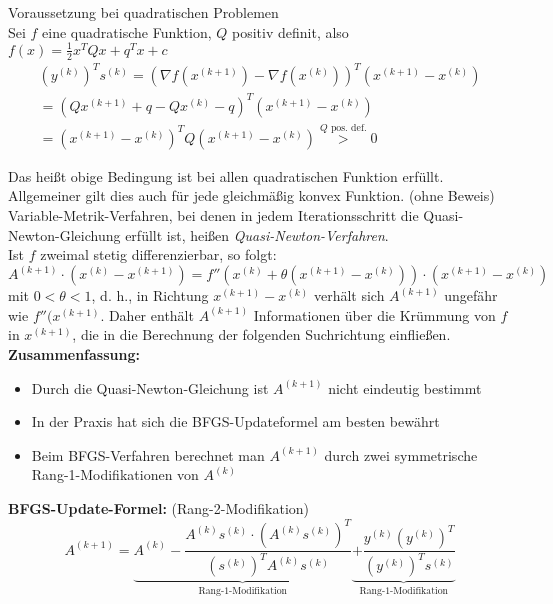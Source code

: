 \begin{Beispiel}{Voraussetzung bei quadratischen Problemen\\}
Sei $f$ eine quadratische Funktion, $Q$ positiv definit, also $f(x)=\frac{1}{2}x^TQx+q^Tx+c$
\begin{align*}
(y^{(k)})^Ts^{(k)} = (\nabla f(x^{(k+1)}) - \nabla f(x^{(k)}))^T(x^{(k+1)} - x^{(k)})\\
= (Qx^{(k+1)}+q - Qx^{(k)}-q)^T(x^{(k+1)} - x^{(k)})\\
=(x^{(k+1)} - x^{(k)})^TQ(x^{(k+1)} - x^{(k)}) \overset{Q\text{ pos. def.}}{>}0
\end{align*}
\end{Beispiel}

Das heißt obige Bedingung ist bei allen quadratischen Funktion erfüllt. Allgemeiner gilt dies auch für jede gleichmäßig konvex Funktion. (ohne Beweis)\\
Variable-Metrik-Verfahren, bei denen in jedem Iterationsschritt die
Quasi-Newton-Gleichung erfüllt ist, heißen \emph{Quasi-Newton-Verfahren}.\\
Ist $f$ zweimal stetig differenzierbar, so folgt:
\[A^{(k+1)}\cdot (x^{(k)}-x^{(k+1)}) = f''(x^{(k)} +\theta (x^{(k+1)}-x^{(k)}))\cdot (x^{(k+1)}-x^{(k)}) \] mit $0<\theta < 1$, d. h., in Richtung $x^{(k+1)}-x^{(k)}$ verhält sich $A^{(k+1)}$ ungefähr wie $f''(x^{(k+1)}$. Daher enthält $A^{(k+1)}$ Informationen über
die Krümmung von $f$ in $x^{(k+1)}$, die in die Berechnung der folgenden
Suchrichtung einfließen.\\

\textbf{Zusammenfassung:}
\begin{itemize}
\item Durch die Quasi-Newton-Gleichung ist  $A^{(k+1)}$ nicht eindeutig
bestimmt
\item In der Praxis hat sich die BFGS-Updateformel am besten bewährt
\item Beim BFGS-Verfahren berechnet man $A^{(k+1)}$ durch zwei symmetrische
Rang-1-Modifikationen von  $A^{(k)}$
\end{itemize}

\textbf{BFGS-Update-Formel:} (Rang-2-Modifikation)
\begin{equation}
A^{(k+1)} = \underbrace{A^{(k)}- \frac{A^{(k)}s^{(k)}\cdot (A^{(k)}s^{(k)})^T}{(s^{(k)})^TA^{(k)}s^{(k)}}}_{\text{Rang-1-Modifikation}}\underbrace{+ \frac{y^{(k)}(y^{(k)})^T}{(y^{(k)})^Ts^{(k)}}}_{\text{Rang-1-Modifikation}}
\end{equation}

